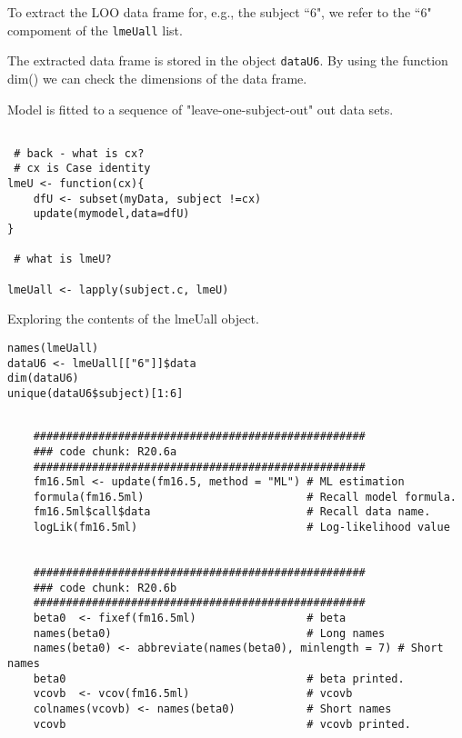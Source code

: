 \documentclass[a4paper,12pt]{article}
\begin{document}
To extract the LOO data frame for, e.g., the subject ``6", we refer to the ``6" compoment of the
\texttt{lmeUall} list.

The extracted data frame is stored in the object \texttt{dataU6}. By using the function dim() we can check the dimensions of the data frame.



Model is fitted to a sequence of "leave-one-subject-out" out data sets.


\begin{framed}
\begin{verbatim}

 # back - what is cx?
 # cx is Case identity
lmeU <- function(cx){
	dfU <- subset(myData, subject !=cx)
	update(mymodel,data=dfU)
}

 # what is lmeU?

lmeUall <- lapply(subject.c, lmeU)
\end{verbatim}
\end{framed}
Exploring the contents of the lmeUall object.
\begin{framed}
\begin{verbatim}
names(lmeUall)
dataU6 <- lmeUall[["6"]]$data
dim(dataU6)
unique(dataU6$subject)[1:6]
\end{verbatim}
\end{framed}

\begin{framed}
	\begin{verbatim}
	
	###################################################
	### code chunk: R20.6a
	###################################################
	fm16.5ml <- update(fm16.5, method = "ML") # ML estimation
	formula(fm16.5ml)                         # Recall model formula.
	fm16.5ml$call$data                        # Recall data name.
	logLik(fm16.5ml)                          # Log-likelihood value
	
	
	###################################################
	### code chunk: R20.6b
	###################################################
	beta0  <- fixef(fm16.5ml)                 # beta
	names(beta0)                              # Long names
	names(beta0) <- abbreviate(names(beta0), minlength = 7) # Short names 
	beta0                                     # beta printed.
	vcovb  <- vcov(fm16.5ml)                  # vcovb 
	colnames(vcovb) <- names(beta0)           # Short names
	vcovb                                     # vcovb printed. 
	
	
	\end{verbatim}
\end{framed}
\newpage
\end{document}
